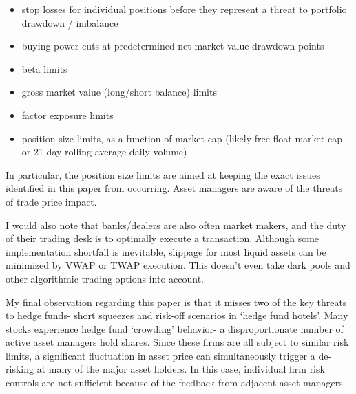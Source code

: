 \documentclass{article}
\begin{document}
\begin{itemize}
    \item stop losses for individual positions before they represent a threat to portfolio drawdown / imbalance
    \item buying power cuts at predetermined net market value drawdown points
    \item beta limits
    \item gross market value (long/short balance) limits
    \item factor exposure limits
    \item position size limits, as a function of market cap (likely free float market cap or 21-day rolling average daily volume)
\end{itemize}

In particular, the position size limits are aimed at keeping the exact issues identified in this paper from occurring. Asset managers are aware of the threats of trade price impact.

I would also note that banks/dealers are also often market makers, and the duty of their trading desk is to optimally execute a transaction. Although some implementation shortfall is inevitable, slippage for most liquid assets can be minimized by VWAP or TWAP execution. This doesn't even take dark pools and other algorithmic trading options into account.

My final observation regarding this paper is that it misses two of the key threats to hedge funds- short squeezes and risk-off scenarios in `hedge fund hotels'. Many stocks experience hedge fund `crowding' behavior- a disproportionate number of active asset managers hold shares. Since these firms are all subject to similar risk limits, a significant fluctuation in asset price can simultaneously trigger a de-risking at many of the major asset holders. In this case, individual firm
risk controls are not sufficient because of the feedback from adjacent asset managers.
\end{document}
